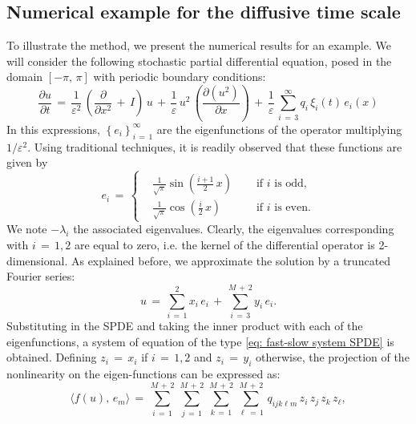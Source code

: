 \subsection{Numerical example for the diffusive time scale}
\label{sub:numerical_example}
To illustrate the method, we present the numerical results for an example. We will consider the following stochastic partial differential equation, posed in the domain $ [ -{\pi},\,{\pi}]$ with periodic boundary conditions:
\begin{equation*}
    \frac{{\partial}u}{{\partial}t} \,=\,\frac{1}{{\varepsilon}^2}\, \left( \frac{\partial}{{\partial}x^2} \,+\,I\right)\,u \,+\, \frac{1}{\varepsilon} \, u^2\,\left(\frac{{\partial}(u^2)}{{\partial}x}\right) \,+\, \frac{1}{\varepsilon} \, \sum_{ i\,=\,3}^{ {\infty}}  q_i\,{\xi}_i(t)\, e_i(x) 
\end{equation*}
In this expressions, $\left\{e_i\right\}_{i\,=\,1}^{\infty}$ are the eigenfunctions of the operator multiplying $1/{\varepsilon}^2$. Using traditional techniques, it is readily observed that these functions are given by
\begin{equation*}
    e_i \,=\, \left\{
        \begin{aligned}
            & \frac{1}{\sqrt{\pi}}\sin\left(\frac{i+1}{2}\,x\right) &\quad \text{ if $i$ is odd,} \\
            & \frac{1}{\sqrt {\pi}}\cos\left(\frac{i}{2}\,x\right) &\quad \text{ if $i$ is even.}
        \end{aligned} \right .
\end{equation*}
We note $-{\lambda}_i$ the associated eigenvalues. Clearly, the eigenvalues corresponding with $i \,=\,1,2$ are equal to zero, i.e. the kernel of the differential operator is 2-dimensional. As explained before, we approximate the solution by a truncated Fourier series:
\begin{equation*}
    u \,=\, \sum_{ i\,=\,1}^{ 2} x_i\,e_i \,+\, \sum_{ i\,=\,3}^{ M\,+\,2} y_i \, e_i.
\end{equation*}
Substituting in the SPDE and taking the inner product with each of the eigenfunctions, a system of equation of the type \eqref{eq: fast-slow system SPDE} is obtained. Defining $z_i \,=\, x_i$ if $i \,=\,1,2$ and $z_i \,=\,y_i$ otherwise, the projection of the nonlinearity on the eigen-functions can be expressed as:
\begin{equation}
    \langle f(u),\,e_m\rangle \,=\,\sum_{ i\,=\,1}^{ M\,+\,2}\, \sum_{ j\,=\,1}^{ M\,+\,2}\,\sum_{ k\,=\,1}^{ M\,+\,2}\,\sum_{ {\ell}\,=\,1}^{ M\,+\,2}\, q_{ijk{\ell}m} \, z_i\,z_j\,z_k\,z_{\ell}, 
    \label{eq: projection nonlin example 1}
\end{equation}
